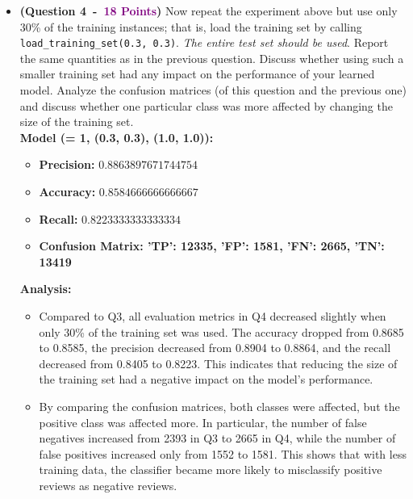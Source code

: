 \documentclass{article}
\newcommand{\POINTS}[1]{\textcolor{purple}{\textbf{{#1}}}}
\begin{document}
\begin{itemize}
\vspace{0.4cm}
 \item \textbf{(Question 4~-~\POINTS{18 Points})} Now repeat the experiment above but use only 30\% of the training instances; that is, load the training set by calling \texttt{load\_training\_set(0.3, 0.3)}. \textit{The entire test set should be used}. Report the same quantities as in the previous question. Discuss whether using such a smaller training set had any impact on the performance of your learned model. Analyze the confusion matrices (of this question and the previous one) and discuss whether one particular class was more affected by changing the size of the training set. 
\\

\noindent \textbf{Model (\alpha = 1, (0.3, 0.3), (1.0, 1.0)):}

\begin{itemize}
    \item \textbf{Precision: }$0.8863897671744754$
    \item \textbf{Accuracy: }$0.8584666666666667$ 
    \item \textbf{Recall: }$0.8223333333333334$
\item \textbf{Confusion Matrix: 'TP': 12335, 'FP': 1581, 'FN': 2665, 'TN': 13419}
\end{itemize}

\noindent \textbf{Analysis:}
\begin{itemize}
    \item Compared to Q3, all evaluation metrics in Q4 decreased slightly when only 30\% of the training set was used. The accuracy dropped from 0.8685 to 0.8585, the precision decreased from 0.8904 to 0.8864, and the recall decreased from 0.8405 to 0.8223. This indicates that reducing the size of the training set had a negative impact on the model's performance.

    \item By comparing the confusion matrices, both classes were affected, but the positive class was affected more. In particular, the number of false negatives increased from 2393 in Q3 to 2665 in Q4, while the number of false positives increased only from 1552 to 1581. This shows that with less training data, the classifier became more likely to misclassify positive reviews as negative reviews.
\end{itemize}





\end{itemize}
\end{document}
